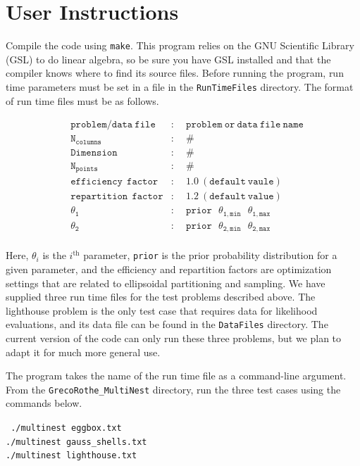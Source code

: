 \documentclass{article}
\def\mtt{\mathtt}
\def\mrm{\mathrm}
\begin{document}
\section{User Instructions}
Compile the code using {\tt make}.  This program relies on the GNU Scientific Library (GSL) to do linear algebra, so be sure  you have GSL installed and that the compiler knows where to find its source files. Before running the program, run time parameters must be set in a file in the {\tt RunTimeFiles} directory. The format of run time files must be as follows. 


\begin{align*}
&\mtt{problem/data \ file}    &:& \ \ \mtt{problem \ or \ data \ file \ name}\\
&\mtt{N_{columns}}  	     &:& \ \ \mtt{\#}\\       
&\mtt{Dimension} 	            &:& \ \ \mtt{\# }\\
&\mtt{N_{points}}                &:& \ \ \mtt{\#}\\
&\mtt{efficiency \  \ factor}   &:& \ \ \mtt{1.0 \ (default \ vaule)}\\  
&\mtt{repartition \  \ factor}  &:& \ \ \mtt{1.2 \ (default \ value)}\\
&\mtt{\theta_1}                    &:& \ \ \mtt{prior \  \ \  \theta_{1,min}  \  \ \ \theta_{1,max}}\\     
&\mtt{\theta_2}                    &:& \ \ \mtt{prior \  \  \ \theta_{2,min}  \  \ \  \theta_{2,max}}\\     
\end{align*}

\noindent Here, $\theta_i$ is the $i^\mrm{th}$ parameter, {\tt prior} is the prior probability distribution for a given parameter, and the efficiency and repartition factors are optimization settings that are related to ellipsoidal partitioning and sampling. We have supplied three run time files for the test problems described above. The lighthouse problem is the only test case that requires data for likelihood evaluations, and its data file can be found in the {\tt DataFiles} directory. The current version of the code can only run these three problems, but we plan to adapt it for much more general use. 

The program takes the name of the run time file as a command-line argument. From the {\tt GrecoRothe\_MultiNest} directory, run the three test cases using the commands below.

\begin{adjustwidth*}{3.6cm}{3.5cm}
 {\tt 
 ./multinest eggbox.txt\\
./multinest gauss\_shells.txt\\
 ./multinest lighthouse.txt\\
 }
 \end{adjustwidth*}
 
\end{document}
